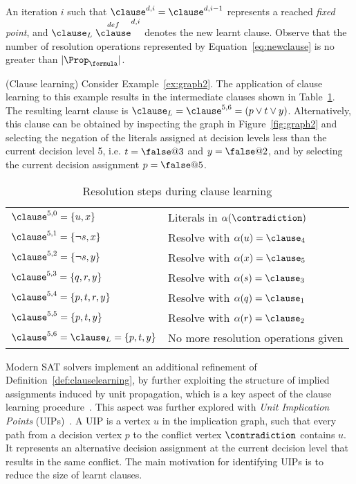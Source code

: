 An iteration $i$ such that $\clause^{d, i} = \clause^{d, i-1}$ represents a
reached \emph{fixed point}, and $\clause_L \stackrel{def} \clause^{d, i}$
denotes the new learnt clause. Observe that the number of resolution
operations represented by Equation~\ref{eq:newclause} is no greater than
$|\Prop_\formula|$.

\begin{example}%
\label{ex:cl}
    (Clause learning)
    Consider Example~\ref{ex:graph2}. The application of clause learning to this
    example results in the intermediate clauses shown in Table~\ref{tab:cl}. The
    resulting learnt clause is $\clause_L = \clause^{5,6} = (p \lor t \lor y)$.
    Alternatively, this clause can be obtained by inspecting the graph in
    Figure~\ref{fig:graph2} and selecting the negation of the literals assigned
    at decision levels less than the current decision level 5, i.e. $t = \false
    @3$ and $y = \false @ 2$, and by selecting the current decision assignment
    $p = \false @5$.

\begin{table}%
\centering
\caption{Resolution steps during clause learning}
    \begin{tabular}{ll}
        \toprule
        $\clause^{5,0} = \{ u, x\}$ & Literals in $\alpha(\contradiction)$ \\
        $\clause^{5,1} = \{ \neg s, x\}$ & Resolve with $\alpha(u) = \clause_4$ \\
        $\clause^{5,2} = \{ \neg s, y\}$ & Resolve with $\alpha(x) = \clause_5$ \\
        $\clause^{5,3} = \{ q, r, y\}$ & Resolve with $\alpha(s) = \clause_3$ \\
        $\clause^{5,4} = \{ p, t, r, y\}$ & Resolve with $\alpha(q) = \clause_1$ \\
        $\clause^{5,5} = \{ p, t, y\}$ & Resolve with $\alpha(r) = \clause_2$ \\
        $\clause^{5,6} = \clause_L = \{ p, t, y\}$ & No more resolution operations given \\
        \toprule
    \end{tabular}%
\label{tab:cl}
\end{table}
\end{example}

Modern SAT solvers implement an additional refinement of
Definition~\ref{def:clauselearning}, by further exploiting the structure of
implied assignments induced by unit propagation, which is a key aspect of the
clause learning procedure~\cite{silva1997grasp}. This aspect was further
explored with \emph{Unit Implication Points} (UIPs)~\cite{silva1997grasp}. A UIP
is a vertex $u$ in the implication graph, such that every path from a decision
vertex $p$ to the conflict vertex $\contradiction$ contains $u$. It represents
an alternative decision assignment at the current decision level that results in
the same conflict. The main motivation for identifying UIPs is to reduce the
size of learnt clauses. 

